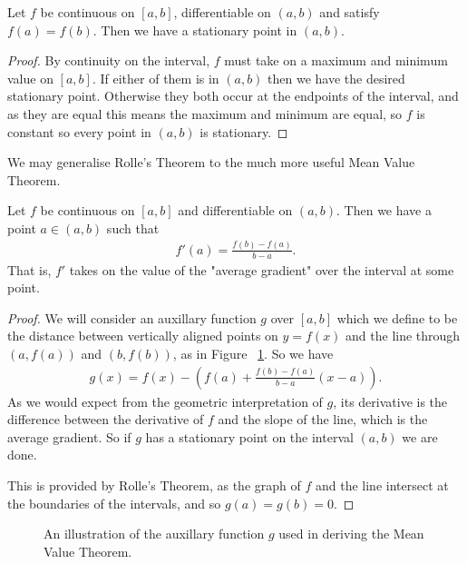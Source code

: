 \documentclass[]{article}
\begin{document}
\begin{thm} 
		Let $f $ be continuous on $[a,b]$, differentiable on  $(a,b)$ and satisfy $f(a) = f(b)$. Then we have a stationary point in $(a,b)$.
\end{thm}

\begin{proof}
		By continuity on the interval, $f$ must take on a maximum and minimum value on $[a,b]$. If either of them is in $(a,b)$ then we have the desired stationary point. Otherwise they both occur at the endpoints of the interval, and as they are equal this means the maximum and minimum are equal, so $f$ is constant so every point in $(a,b)$ is stationary.
\end{proof}

We may generalise Rolle's Theorem to the much more useful Mean Value Theorem.

\begin{thm} 
		Let $f$ be continuous on $[a,b]$ and differentiable on $(a,b)$. Then we have a point $a \in (a,b)$ such that 
		\begin{align*}
				f'(a) = \frac{f(b)-f(a)}{b-a}.
		\end{align*}
		That is, $f'$ takes on the value of the "average gradient" over the interval at some point.
\end{thm}

\begin{proof}
		We will consider an auxillary function $g$ over $[a,b]$ which we define to be the distance between vertically aligned points on $y = f(x)$ and the line through $(a,f(a))$ and $(b,f(b))$, as in Figure ~\ref{fig:mean-value-theorem}. So we have
		\begin{align*}
				g(x) = f(x) - (f(a) + \frac{f(b) - f(a)}{b -a }(x-a)).
		\end{align*}
		As we would expect from the geometric interpretation of $g$, its derivative is the difference between the derivative of $f$ and the slope of the line, which is the average gradient. So if $g$ has a stationary point on the interval $(a,b)$ we are done. 

		This is provided by Rolle's Theorem, as the graph of $f$ and the line intersect at the boundaries of the intervals, and so $g(a) = g(b) = 0$.
\end{proof}

\begin{figure}[ht]
\centering
{}
\caption{An illustration of the auxillary function $g$ used in deriving the Mean Value Theorem.}
\label{fig:mean-value-theorem}
\end{figure}
\end{document}
